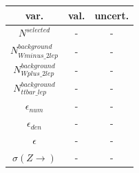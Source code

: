 \begin{tabular}{ | c | c | c |}
  \hline			
  var. & val. & uncert. \\
  \hline 
  
  $N^{selected}$ & - & - \\
  
  $N^{background}_{Wminus\_2lep}$ & - & - \\
  
  $N^{background}_{Wplus\_2lep}$ & - & - \\
  
  $N^{background}_{ttbar\_lep}$ & - & - \\
  
  $\epsilon_{num}$ & - & - \\
  
  $\epsilon_{den}$ & - & - \\
  \hline  
  $\epsilon$ &  - & - \\
  $\sigma(Z \rightarrow )$ &  - & - \\
  \hline  
\end{tabular}